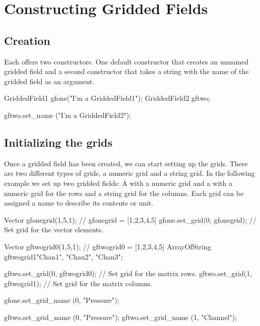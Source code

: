 \section{Constructing Gridded Fields}
\label{sec:griddedfields:construct}


\subsection{Creation}
\label{sec:griddedfields:create}

Each  offers two constructors. One default
constructor that creates an unnamed gridded field and a second constructor
that takes a string with the name of the gridded field as an argument.

\begin{code}
GriddedField1 gfone("I'm a GriddedField1");
GriddedField2 gftwo;

gftwo.set_name ("I'm a GriddedField2");
\end{code}


\subsection{Initializing the grids}
\label{sec:griddedfields:initgrids}

Once a gridded field has been created, we can start setting up the
grids. There are two different types of grids, a numeric grid and a
string grid. In the following example we set up two gridded fields: A
 with a numeric grid and a 
with a numeric grid for the rows and a string grid for the columns. Each grid
can be assigned a name to describe its contents or unit.

\begin{code}
Vector gfonegrid(1,5,1);        // gfonegrid = [1,2,3,4,5]
gfone.set_grid(0, gfonegrid);   // Set grid for the vector elements.

Vector gftwogrid0(1,5,1);       // gftwogrid0 = [1,2,3,4,5]
ArrayOfString gftwogrid1{"Chan1", "Chan2", "Chan3"};

gftwo.set_grid(0, gftwogrid0);  // Set grid for the matrix rows.
gftwo.set_grid(1, gftwogrid1);  // Set grid for the matrix columns.

gfone.set_grid_name (0, "Pressure");

gftwo.set_grid_name (0, "Pressure");
gftwo.set_grid_name (1, "Channel");
\end{code}

